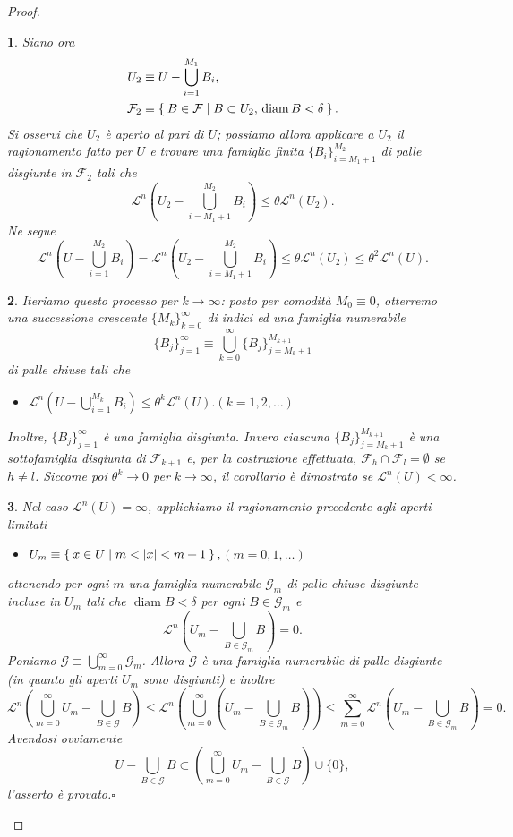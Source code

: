 \documentclass[a4paper,10pt,openright,oneside]{book}
\theoremstyle{theoremstyle}
\theoremstyle{theoremstylewoheader}
\theoremstyle{theoremstyle}
\theoremstyle{proofsecstyle}
\newtheorem{proofsec}{}
\theoremstyle{nonumberplain}
\newtheorem{proof}{Dim.}
\newcommand{\FF}{\ensuremath{\mathcal{F}}}
\newcommand{\GG}{\ensuremath{\mathcal{G}}}
\newcommand{\Leb}{\ensuremath{\mathcal{L}}}
\newcommand{\abs}[1]{\ensuremath{\lvert #1 \rvert}}
\DeclareMathOperator{\diam}{diam}
\renewcommand{\qedsymbol}{\ensuremath{\square}}
\newcommand{\qed}{\unskip\nobreak\hfill\nobreak\hspace{.5em}\qedsymbol}
\newcommand{\mymath}[2]{\begin{itemize}%
  \item[]\hfill\hbox{}\ensuremath{\displaystyle #1}\hfill\ensuremath{\displaystyle #2}%
  \end{itemize}}
\begin{document}
\begin{proof}
\begin{proofsec}
Siano ora
\begin{align*}
U_2 &\equiv U - \bigcup_{i=1}^{M_1} B_i,\\
\FF_2 &\equiv \Set{ B \in \FF | B \subset U_2,\, \diam B < \delta }.
\end{align*}
Si osservi che $U_2$ è aperto al pari di $U$; possiamo allora applicare a $U_2$ il ragionamento fatto per $U$ e trovare una famiglia finita $\{B_i\}_{i={M_1+1}}^{M_2}$ di palle disgiunte in $\FF_2$ tali che
\[
\Leb^n \left(U_2 - \bigcup_{i=M_1 + 1}^{M_2} B_i\right) \le \theta\Leb^n(U_2).
\]
Ne segue
\[
\Leb^n \left(U - \bigcup_{i=1}^{M_2} B_i\right) = \Leb^n \left(U_2 - \bigcup_{i=M_1 + 1}^{M_2} B_i\right)\le \theta\Leb^n(U_2) \le \theta^2\Leb^n(U).
\]
\end{proofsec}

\begin{proofsec}
Iteriamo questo processo per $k \to \infty$: posto per comodità $M_0 \equiv 0$, otterremo una successione crescente $\{M_k\}_{k=0}^\infty$ di indici ed una famiglia numerabile
\[
\{B_j\}_{j=1}^\infty \equiv \bigcup_{k=0}^\infty \{B_j\}_{j=M_k + 1}^{M_{k+1}}
\]
di palle chiuse tali che \mymath{\Leb^n \left(U - \bigcup_{i=1}^{M_k} B_i\right) \le \theta^k \Leb^n (U).}{(k = 1, 2, \ldots)} Inoltre, $\{B_j\}_{j=1}^\infty$ è una famiglia \emph{disgiunta}. Invero ciascuna $\{B_j\}_{j=M_k + 1}^{M_{k+1}}$ è una sottofamiglia disgiunta di $\FF_{k+1}$ e, per la costruzione effettuata, $\FF_h \cap \FF_l = \emptyset$ se $h \ne l$. Siccome poi $\theta^k \to 0$ per $k \to \infty$, il corollario è dimostrato se $\Leb^n (U) < \infty$.
\end{proofsec}

\begin{proofsec}
Nel caso $\Leb^n (U) = \infty$, applichiamo il ragionamento precedente agli aperti limitati \mymath{U_m \equiv \Set{ x \in U | m < \abs{x} < m + 1 },}{(m = 0, 1, \ldots)} ottenendo per ogni $m$ una famiglia numerabile $\GG_m$ di palle chiuse disgiunte incluse in $U_m$ tali che $\diam B < \delta$ per ogni $B \in \GG_m$ e
\[
\Leb^n \left(U_m - \bigcup_{B \in \GG_m} B\right) = 0.
\]
Poniamo $\GG \equiv \bigcup_{m = 0}^\infty \GG_m$. Allora $\GG$ è una famiglia numerabile di palle disgiunte (in quanto gli aperti $U_m$ sono disgiunti) e inoltre
\[
\Leb^n \left(\bigcup_{m=0}^\infty U_m - \bigcup_{B \in \GG} B\right) \le \Leb^n \left(\bigcup_{m=0}^\infty \left(U_m - \bigcup_{B \in \GG_m} B\right)\right) \le \sum_{m=0}^\infty \Leb^n \left(U_m - \bigcup_{B \in \GG_m} B\right) = 0.
\]
Avendosi ovviamente
\[
U - \bigcup_{B \in \GG} B \subset \left(\bigcup_{m=0}^\infty U_m - \bigcup_{B \in \GG} B\right) \cup \{0\},
\]
l'asserto è provato.\qed
\end{proofsec}
\end{proof}
\end{document}
